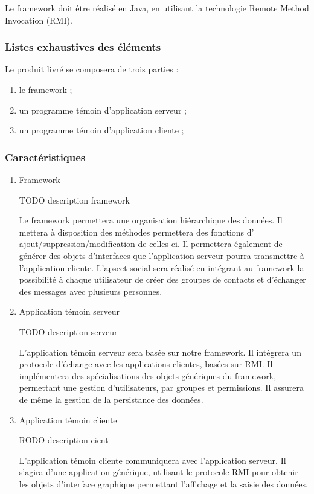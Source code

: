 Le framework doit être réalisé en Java, en utilisant la technologie Remote Method Invocation (RMI).

\subsubsection{Listes exhaustives des éléments} 
Le produit livré se composera de trois parties :
\begin{enumerate}
 \item le framework ;
 \item un programme témoin d'application serveur ;
 \item un programme témoin d'application cliente ;
\end{enumerate}

\subsubsection{Caractéristiques}
\begin{enumerate}
 \item Framework

TODO description framework

Le framework permettera une organisation hiérarchique des données.
Il mettera à disposition des méthodes permettera des fonctions d' ajout/suppression/modification de celles-ci.
Il permettera également de générer des objets d'interfaces que l'application serveur pourra transmettre à l'application cliente.
L'apsect social sera réalisé en intégrant au framework la possibilité à chaque utilisateur de créer des groupes de contacts et d'échanger des messages avec plusieurs personnes.

 \item Application témoin serveur

TODO description serveur

L'application témoin serveur sera basée sur notre framework.
Il intégrera un protocole d'échange avec les applications clientes, basées sur RMI.
Il implémentera des spécialisations des objets génériques du framework, permettant une gestion d'utilisateurs, par groupes et permissions.
Il assurera de même la gestion de la persistance des données.

 \item Application témoin cliente

RODO description cient

L'application témoin cliente communiquera avec l'application serveur.
Il s'agira d'une application générique, utilisant le protocole RMI pour obtenir les objets
d'interface graphique permettant l'affichage et la saisie des données.
\end{enumerate}

